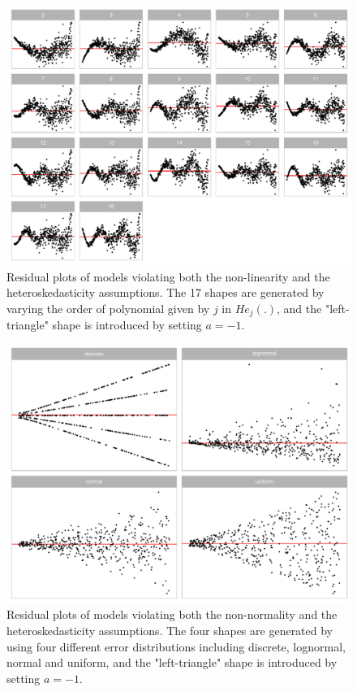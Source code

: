 \documentclass[]{interact}
\theoremstyle{plain}%
\theoremstyle{definition}
\theoremstyle{remark}
\begin{document}
\begin{figure}[!h]

{\centering \includegraphics[width=1\linewidth]{paper_files/figure-latex/different-j-heter-1} 

}

\caption{Residual plots of models violating both the non-linearity and the heteroskedasticity assumptions. The 17 shapes are generated by varying the order of polynomial given by $j$ in $He_j(.)$, and the "left-triangle" shape is introduced by setting $a = -1$.}\label{fig:different-j-heter}
\end{figure}

\begin{figure}[!h]

{\centering \includegraphics[width=1\linewidth]{paper_files/figure-latex/different-e-heter-1} 

}

\caption{Residual plots of models violating both the non-normality and the heteroskedasticity assumptions. The four shapes are generated by using four different error distributions including discrete, lognormal, normal and uniform, and the "left-triangle" shape is introduced by setting $a = -1$. }\label{fig:different-e-heter}
\end{figure}
\end{document}
